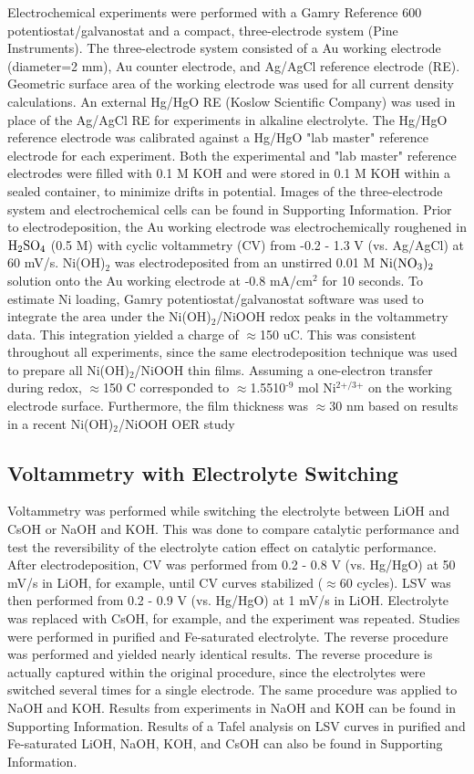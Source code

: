 \documentclass[journal=jpccck,manuscript=article,email=true]{achemso}
\begin{document}
Electrochemical experiments were performed with a Gamry Reference 600 potentiostat/galvanostat and a compact, three-electrode system (Pine Instruments). The three-electrode system consisted of a Au working electrode (diameter=2 mm), Au counter electrode, and Ag/AgCl reference electrode (RE). Geometric surface area of the working electrode was used for all current density calculations. An external Hg/HgO RE (Koslow Scientific Company) was used in place of the Ag/AgCl RE for experiments in alkaline electrolyte. The Hg/HgO reference electrode was calibrated against a Hg/HgO "lab master" reference electrode for each experiment. Both the experimental and "lab master" reference electrodes were filled with 0.1 M KOH and were stored in 0.1 M KOH within a sealed container, to minimize drifts in potential. Images of the three-electrode system and electrochemical cells can be found in Supporting Information. Prior to electrodeposition, the Au working electrode was electrochemically roughened in \(\ce{H2SO4}\) (0.5 M) with cyclic voltammetry (CV) from -0.2 - 1.3 V (vs. Ag/AgCl) at 60 mV/s. Ni(OH)$_{\text{2}}$ was electrodeposited from an unstirred 0.01 M \(\ce{Ni(NO3)2}\) solution onto the Au working electrode at -0.8 mA/cm$^{\text{2}}$ for 10 seconds. To estimate Ni loading, Gamry potentiostat/galvanostat software was used to integrate the area under the Ni(OH)$_{\text{2}}$/NiOOH redox peaks in the voltammetry data. This integration yielded a charge of $\approx$150 uC. This was consistent throughout all experiments, since the same electrodeposition technique was used to prepare all Ni(OH)$_{\text{2}}$/NiOOH thin films. Assuming a one-electron transfer during redox, $\approx$150 \textmu{}C corresponded to $\approx$1.55\texttimes{}10$^{\text{-9}}$ mol Ni$^{\text{2+/3+}}$ on the working electrode surface. Furthermore, the film thickness was $\approx$30 nm based on results in a recent Ni(OH)$_{\text{2}}$/NiOOH OER study \cite{trotochaud-2014-nickel-iron}

\subsection{Voltammetry with Electrolyte Switching}
\label{sec-2-2}
Voltammetry was performed while switching the electrolyte between LiOH and CsOH or NaOH and KOH. This was done to compare catalytic performance and test the reversibility of the electrolyte cation effect on catalytic performance. After electrodeposition, CV was performed from 0.2 - 0.8 V (vs. Hg/HgO) at 50 mV/s in LiOH, for example, until CV curves stabilized ($\approx$60 cycles). LSV was then performed from 0.2 - 0.9 V (vs. Hg/HgO) at 1 mV/s in LiOH. Electrolyte was replaced with CsOH, for example, and the experiment was repeated. Studies were performed in purified and Fe-saturated electrolyte. The reverse procedure was performed and yielded nearly identical results. The reverse procedure is actually captured within the original procedure, since the electrolytes were switched several times for a single electrode. The same procedure was applied to NaOH and KOH. Results from experiments in NaOH and KOH can be found in Supporting Information. Results of a Tafel analysis on LSV curves in purified and Fe-saturated LiOH, NaOH, KOH, and CsOH can also be found in Supporting Information.
\end{document}
